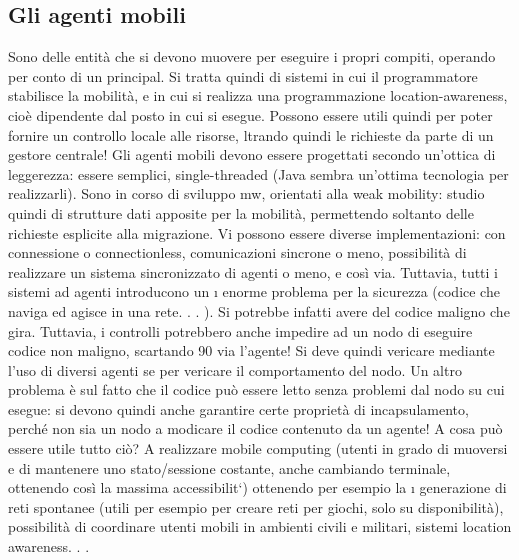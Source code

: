 \subsection{Gli agenti mobili}
Sono delle entità che si devono muovere per eseguire i propri compiti, operando
per conto di un principal. Si tratta quindi di sistemi in cui il programmatore stabilisce la mobilità, e in cui si
realizza una programmazione location-awareness,
cioè dipendente dal posto in cui si esegue. Possono essere utili quindi per poter
fornire un controllo locale alle risorse, ltrando quindi le richieste da parte di un
gestore centrale! Gli agenti mobili devono essere progettati secondo un'ottica di
leggerezza: essere semplici, single-threaded (Java sembra un'ottima tecnologia
per realizzarli). Sono in corso di sviluppo mw, orientati alla weak mobility:
studio quindi di strutture dati apposite per la mobilità, permettendo soltanto
delle richieste esplicite alla migrazione.
Vi possono essere diverse implementazioni: con connessione o connectionless,
comunicazioni sincrone o meno, possibilità di realizzare un sistema sincronizzato
di agenti o meno, e così via. Tuttavia, tutti i sistemi ad agenti introducono un
\i{}
enorme problema per la sicurezza (codice che naviga ed agisce in una rete. . . ). Si
potrebbe infatti avere del codice maligno che gira. Tuttavia, i controlli potrebbero anche impedire ad un nodo di
eseguire codice non maligno, scartando
90
via l'agente! Si deve quindi vericare mediante l'uso di diversi agenti se per
vericare il comportamento del nodo.
Un altro problema è sul fatto che il codice può essere letto senza problemi
dal nodo su cui esegue: si devono quindi anche garantire certe proprietà di
incapsulamento, perché non sia un nodo a modicare il codice contenuto da un
agente!
A cosa può essere utile tutto ciò? A realizzare mobile computing (utenti in
grado di muoversi e di mantenere uno stato/sessione costante, anche cambiando
terminale, ottenendo così la massima accessibilit`) ottenendo per esempio la
\i{}
generazione di reti spontanee (utili per esempio per creare reti per giochi, solo su
disponibilità), possibilità di coordinare utenti mobili in ambienti civili e militari,
sistemi location awareness. . .